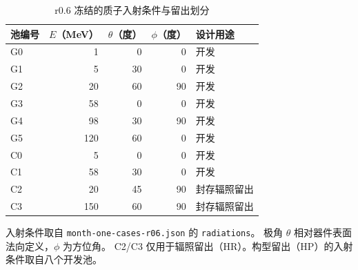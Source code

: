 \begin{table}[tbp]
  \centering
  \small
  \caption{r0.6 冻结的质子入射条件与留出划分}
  \label{tab:r06-modeling-proton-pools}
  \begin{tabularx}{\linewidth}{@{}lrrr>{\raggedright\arraybackslash}X@{}}
    \toprule
    池编号 & \(E\)（MeV） & \(\theta\)（度） & \(\phi\)（度） & 设计用途 \\
    \midrule
    G0 &   1 &  0 &  0 & 开发 \\
    G1 &   5 & 30 &  0 & 开发 \\
    G2 &  20 & 60 & 90 & 开发 \\
    G3 &  58 &  0 &  0 & 开发 \\
    G4 &  98 & 30 & 90 & 开发 \\
    G5 & 120 & 60 &  0 & 开发 \\
    C0 &   5 &  0 &  0 & 开发 \\
    C1 &  58 & 30 &  0 & 开发 \\
    \addlinespace
    C2 &  20 & 45 & 90 & 封存辐照留出 \\
    C3 & 150 & 60 & 90 & 封存辐照留出 \\
    \bottomrule
  \end{tabularx}
  \par\smallskip
  \begin{minipage}{\linewidth}
    \footnotesize
    入射条件取自 \texttt{month-one-cases-r06.json} 的 \texttt{radiations}。
    极角 \(\theta\) 相对器件表面法向定义，\(\phi\) 为方位角。
    C2/C3 仅用于辐照留出（HR）。构型留出（HP）的入射条件取自八个开发池。
  \end{minipage}
\end{table}

